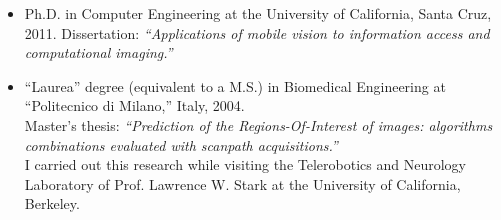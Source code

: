 \vspace{-7mm}
\begin{itemize}[-]
\item Ph.D. in Computer Engineering at the University of California, Santa Cruz, 2011. Dissertation: \emph{``Applications of mobile vision to information access and computational imaging.''}

\item  ``Laurea'' degree (equivalent to a M.S.) in Biomedical Engineering at ``Politecnico di Milano,'' Italy, 2004.\\
Master's thesis: \emph{``Prediction of the Regions-Of-Interest of images: algorithms combinations evaluated with scanpath acquisitions.''}\\
I carried out this research while visiting the Telerobotics and Neurology Laboratory of Prof. Lawrence W. Stark at the University of California, Berkeley.%

\end{itemize}

